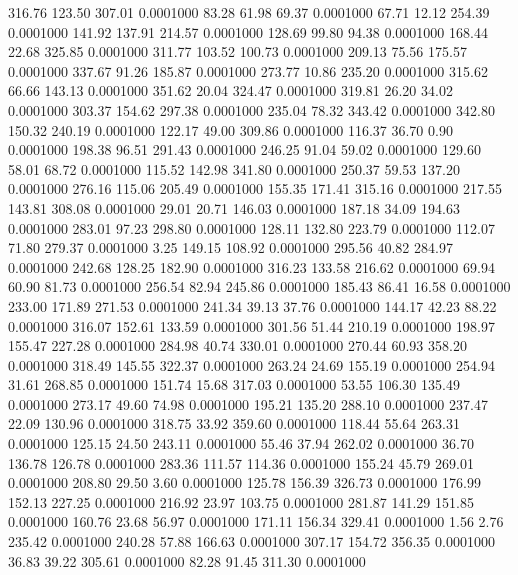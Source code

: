  316.76  123.50  307.01   0.0001000
  83.28   61.98   69.37   0.0001000
  67.71   12.12  254.39   0.0001000
 141.92  137.91  214.57   0.0001000
 128.69   99.80   94.38   0.0001000
 168.44   22.68  325.85   0.0001000
 311.77  103.52  100.73   0.0001000
 209.13   75.56  175.57   0.0001000
 337.67   91.26  185.87   0.0001000
 273.77   10.86  235.20   0.0001000
 315.62   66.66  143.13   0.0001000
 351.62   20.04  324.47   0.0001000
 319.81   26.20   34.02   0.0001000
 303.37  154.62  297.38   0.0001000
 235.04   78.32  343.42   0.0001000
 342.80  150.32  240.19   0.0001000
 122.17   49.00  309.86   0.0001000
 116.37   36.70    0.90   0.0001000
 198.38   96.51  291.43   0.0001000
 246.25   91.04   59.02   0.0001000
 129.60   58.01   68.72   0.0001000
 115.52  142.98  341.80   0.0001000
 250.37   59.53  137.20   0.0001000
 276.16  115.06  205.49   0.0001000
 155.35  171.41  315.16   0.0001000
 217.55  143.81  308.08   0.0001000
  29.01   20.71  146.03   0.0001000
 187.18   34.09  194.63   0.0001000
 283.01   97.23  298.80   0.0001000
 128.11  132.80  223.79   0.0001000
 112.07   71.80  279.37   0.0001000
   3.25  149.15  108.92   0.0001000
 295.56   40.82  284.97   0.0001000
 242.68  128.25  182.90   0.0001000
 316.23  133.58  216.62   0.0001000
  69.94   60.90   81.73   0.0001000
 256.54   82.94  245.86   0.0001000
 185.43   86.41   16.58   0.0001000
 233.00  171.89  271.53   0.0001000
 241.34   39.13   37.76   0.0001000
 144.17   42.23   88.22   0.0001000
 316.07  152.61  133.59   0.0001000
 301.56   51.44  210.19   0.0001000
 198.97  155.47  227.28   0.0001000
 284.98   40.74  330.01   0.0001000
 270.44   60.93  358.20   0.0001000
 318.49  145.55  322.37   0.0001000
 263.24   24.69  155.19   0.0001000
 254.94   31.61  268.85   0.0001000
 151.74   15.68  317.03   0.0001000
  53.55  106.30  135.49   0.0001000
 273.17   49.60   74.98   0.0001000
 195.21  135.20  288.10   0.0001000
 237.47   22.09  130.96   0.0001000
 318.75   33.92  359.60   0.0001000
 118.44   55.64  263.31   0.0001000
 125.15   24.50  243.11   0.0001000
  55.46   37.94  262.02   0.0001000
  36.70  136.78  126.78   0.0001000
 283.36  111.57  114.36   0.0001000
 155.24   45.79  269.01   0.0001000
 208.80   29.50    3.60   0.0001000
 125.78  156.39  326.73   0.0001000
 176.99  152.13  227.25   0.0001000
 216.92   23.97  103.75   0.0001000
 281.87  141.29  151.85   0.0001000
 160.76   23.68   56.97   0.0001000
 171.11  156.34  329.41   0.0001000
   1.56    2.76  235.42   0.0001000
 240.28   57.88  166.63   0.0001000
 307.17  154.72  356.35   0.0001000
  36.83   39.22  305.61   0.0001000
  82.28   91.45  311.30   0.0001000
